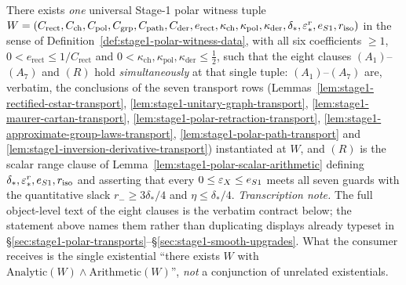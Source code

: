 \begin{lemma}\label{lem:stage1-polar-constant-ledger}
There exists \emph{one} universal Stage-1 polar witness tuple
$W=(C_{\mathrm{rect}},C_{\mathrm{ch}},C_{\mathrm{pol}},C_{\mathrm{grp}},C_{\mathrm{path}},
C_{\mathrm{der}},e_{\mathrm{rect}},\kappa_{\mathrm{ch}},\kappa_{\mathrm{pol}},
\kappa_{\mathrm{der}},\delta_*,\varepsilon^{r}_{*},e_{S1},r_{\mathrm{iso}})$ in the sense of
Definition~\ref{def:stage1-polar-witness-data}, with all six coefficients $\ge1$,
$0<e_{\mathrm{rect}}\le1/C_{\mathrm{rect}}$ and
$0<\kappa_{\mathrm{ch}},\kappa_{\mathrm{pol}},\kappa_{\mathrm{der}}\le\tfrac12$, such that
the eight clauses $(A_1)$--$(A_7)$ and $(R)$ hold \emph{simultaneously} at that single
tuple: $(A_1)$--$(A_7)$ are, verbatim, the conclusions of the seven transport rows
(Lemmas~\ref{lem:stage1-rectified-cstar-transport},
\ref{lem:stage1-unitary-graph-transport}, \ref{lem:stage1-maurer-cartan-transport},
\ref{lem:stage1-polar-retraction-transport},
\ref{lem:stage1-approximate-group-laws-transport},
\ref{lem:stage1-polar-path-transport} and
\ref{lem:stage1-inversion-derivative-transport}) instantiated at $W$, and $(R)$ is the
scalar range clause of Lemma~\ref{lem:stage1-polar-scalar-arithmetic} defining
$\delta_*,\varepsilon^{r}_{*},e_{S1},r_{\mathrm{iso}}$ and asserting that every
$0\le\varepsilon_X\le e_{S1}$ meets all seven guards with the quantitative slack
$r_-\ge3\delta_*/4$ and $\eta\le\delta_*/4$.
\emph{Transcription note.} The full object-level text of the eight clauses is the
verbatim contract below; the statement above names them rather than duplicating displays
already typeset in \S\ref{sec:stage1-polar-transports}--\S\ref{sec:stage1-smooth-upgrades}.
What the consumer receives is the single existential ``there exists $W$ with
$\mathrm{Analytic}(W)\wedge\mathrm{Arithmetic}(W)$'', \emph{not} a conjunction of unrelated
existentials.
\end{lemma}

